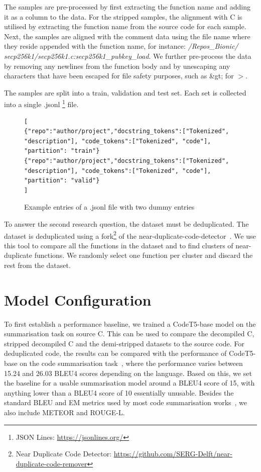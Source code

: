 The samples are pre-processed by first extracting the function name and adding it as a column to the data. For the stripped samples, the alignment with C is utilised by extracting the function name from the source code for each sample. Next, the samples are aligned with the comment data using the file name where they reside appended with the function name, for instance: \textit{/Repos\_Bionic/ secp256k1/secp256k1.c:secp256k1\_pubkey\_load}. We further pre-process the data by removing any newlines from the function body and by unescaping any characters that have been escaped for file safety purposes, such as \&gt; for $>$.

The samples are split into a train, validation and test set. Each set is collected into a single .jsonl \footnote{JSON Lines: \url{https://jsonlines.org/}} file.

\begin{figure}[H]
  \centering
\begin{lstlisting}[breaklines=true]
[
{"repo":"author/project","docstring_tokens":["Tokenized", "description"], "code_tokens":["Tokenized", "code"], "partition": "train"}
{"repo":"author/project","docstring_tokens":["Tokenized", "description"], "code_tokens":["Tokenized", "code"], "partition": "valid"}
]
\end{lstlisting}
  \caption{Example entries of a .jsonl file with two dummy entries}
  \label{fig:jsonl}
\end{figure}


To answer the second research question, the dataset must be deduplicated. The dataset is deduplicated using a fork\footnote{Near Duplicate Code Detector: \url{https://github.com/SERG-Delft/near-duplicate-code-remover}} of the near-duplicate-code-detector~\cite{allamanis_adverse}. We use this tool to compare all the functions in the dataset and to find clusters of near-duplicate functions. We randomly select one function per cluster and discard the rest from the dataset. 


\section{Model Configuration}
To first establish a performance baseline, we trained a CodeT5-base model on the summarisation task on source C. This can be used to compare the decompiled C, stripped decompiled C and the demi-stripped datasets to the source code. For deduplicated code, the results can be compared with the performance of CodeT5-base on the code summarisation task~\cite{CodeT5}, where the performance varies between 15.24 and 26.03 BLEU4 scores depending on the language. Based on this, we set the baseline for a usable summarisation model around a BLEU4 score of 15, with anything lower than a BLEU4 score of 10 essentially unusable. Besides the standard BLEU and EM metrics used by most code summarisation works~\cite{CodeBERT, CodeT5, CodeXGlue, PolyglotCodeBERT, CodeSumSmallLocal, recommend_summarization}, we also include METEOR and ROUGE-L. 

